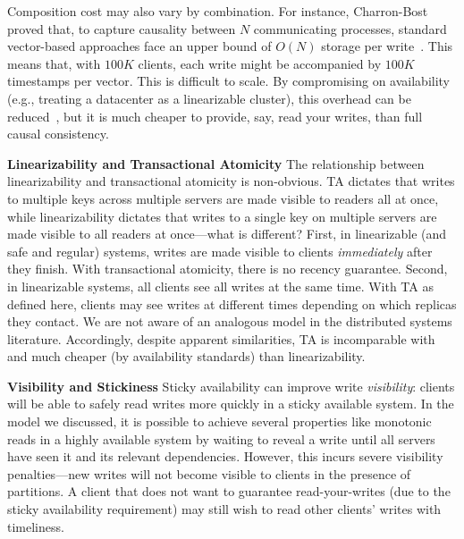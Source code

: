 Composition cost may also vary by combination. For instance, Charron-Bost
 proved that, to capture causality between $N$ communicating
processes, standard vector-based approaches face an upper bound of
$O(N)$ storage per write~\cite{charron-bost}. This means that, with
$100K$ clients, each write might be accompanied by $100K$ timestamps
per vector. This is difficult to scale. By compromising on
availability (e.g., treating a datacenter as a linearizable cluster),
this overhead can be reduced~\cite{eiger}, but it is much
cheaper to provide, say, read your writes, than full causal
consistency.

\vspace{.5em}\noindent\textbf{Linearizability and Transactional
  Atomicity} The relationship between linearizability and
transactional atomicity is non-obvious. TA dictates that writes to
multiple keys across multiple servers are made visible to readers all
at once, while linearizability dictates that writes to a single key on
multiple servers are made visible to all readers at once---what is
different? First, in linearizable (and safe and regular) systems,
writes are made visible to clients \textit{immediately} after they
finish. With transactional atomicity, there is no recency
guarantee. Second, in linearizable systems, all clients see all writes
at the same time. With TA as defined here, clients may see writes at
different times depending on which replicas they contact. We are not
aware of an analogous model in the distributed systems
literature. Accordingly, despite apparent similarities, TA is
incomparable with and much cheaper (by availability standards) than
linearizability.

\vspace{.5em}\noindent\textbf{Visibility and Stickiness} Sticky
availability can improve write \textit{visibility}: clients will be
able to safely read writes more quickly in a sticky available
system. In the model we discussed, it is possible to achieve several
properties like monotonic reads in a highly available system by
waiting to reveal a write until all servers have seen it and its
relevant dependencies. However, this incurs severe visibility
penalties---new writes will not become visible to clients in the
presence of partitions. A client that does not want to guarantee
read-your-writes (due to the sticky availability requirement) may
still wish to read other clients' writes with timeliness.
